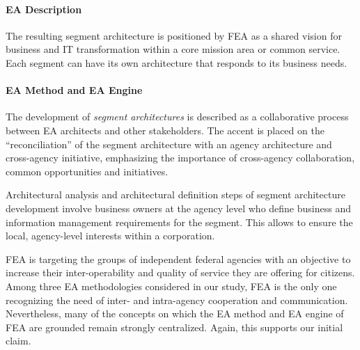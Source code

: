 \paragraph*{EA Description}

The resulting segment architecture is positioned by FEA as a shared vision for business and IT transformation within a core mission area or common service. Each segment can have its own architecture that responds to its business needs.

\paragraph*{EA Method and EA Engine}

The development of \textit{segment architectures} is described as a collaborative process between EA architects and other stakeholders. The accent is placed on the ``reconciliation'' of the segment architecture with an agency architecture and cross-agency initiative, emphasizing the importance of  cross-agency collaboration, common opportunities and initiatives.

Architectural analysis and architectural definition steps of segment architecture development involve business owners at the agency level who define business and information management requirements for the segment. This allows to ensure the local, agency-level interests within a corporation. 

FEA is targeting the groups of independent federal agencies with an objective to increase their inter-operability and quality of service they are offering for citizens. Among three EA methodologies considered in our study, FEA is the only one recognizing the need of inter- and intra-agency cooperation and communication. Nevertheless, many of the concepts on which the EA method and EA engine of FEA are grounded remain strongly centralized. Again, this supports our initial claim.


